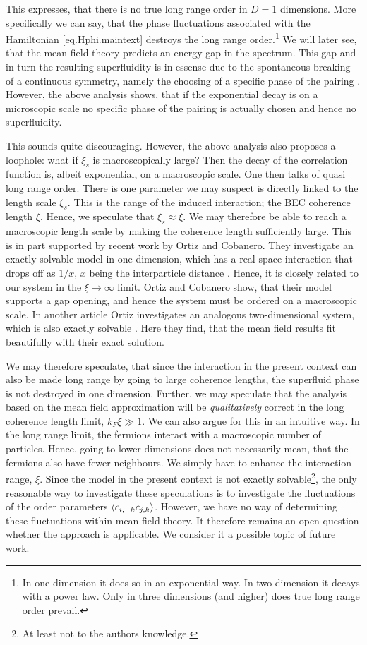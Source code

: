 This expresses, that there is no true long range order in $D = 1$ dimensions. More specifically we can say, that the phase fluctuations associated with the Hamiltonian \eqref{eq.Hphi.maintext} destroys the long range order.\footnote{In one dimension it does so in an exponential way. In two dimension it decays with a power law. Only in three dimensions (and higher) does true long range order prevail.} We will later see, that the mean field theory predicts an energy gap in the spectrum. This gap and in turn the resulting superfluidity is in essense due to the spontaneous breaking of a continuous symmetry, namely the choosing of a specific phase of the pairing \cite[pp. 341-346]{BruusFlensberg}. However, the above analysis shows, that if the exponential decay is on a microscopic scale no specific phase of the pairing is actually chosen and hence no superfluidity. 

This sounds quite discouraging. However, the above analysis also proposes a loophole: what if $\xi_s$ is macroscopically large? Then the decay of the correlation function is, albeit exponential, on a macroscopic scale. One then talks of quasi long range order. There is one parameter we may suspect is directly linked to the length scale $\xi_s$. This is the range of the induced interaction; the BEC coherence length $\xi$. Hence, we speculate that $\xi_s \approx \xi$. We may therefore be able to reach a macroscopic length scale by making the coherence length sufficiently large. This is in part supported by recent work by Ortiz and Cobanero. They investigate an exactly solvable model in one dimension, which has a real space interaction that drops off as $1 / x$, $x$ being the interparticle distance \cite{Ortiz.Beyondmeanfieldtheory}. Hence, it is closely related to our system in the $\xi \to \infty$ limit. Ortiz and Cobanero show, that their model supports a gap opening, and hence the system must be ordered on a macroscopic scale. In another article Ortiz investigates an analogous two-dimensional system, which is also exactly solvable \cite{Ortiz.pxpy}. Here they find, that the mean field results fit beautifully with their exact solution.

We may therefore speculate, that since the interaction in the present context can also be made long range by going to large coherence lengths, the superfluid phase is not destroyed in one dimension. Further, we may speculate that the analysis based on the mean field approximation will be \textit{qualitatively} correct in the long coherence length limit, $k_F\xi \gg 1$. We can also argue for this in an intuitive way. In the long range limit, the fermions interact with a macroscopic number of particles. Hence, going to lower dimensions does not necessarily mean, that the fermions also have fewer neighbours. We simply have to enhance the interaction range, $\xi$. Since the model in the present context is not exactly solvable\footnote{At least not to the authors knowledge.}, the only reasonable way to investigate these speculations is to investigate the fluctuations of the order parameters $\braket{c_{i,-k}c_{j,k}}$. However, we have no way of determining these fluctuations within mean field theory. It therefore remains an open question whether the approach is applicable. We consider it a possible topic of future work. 

